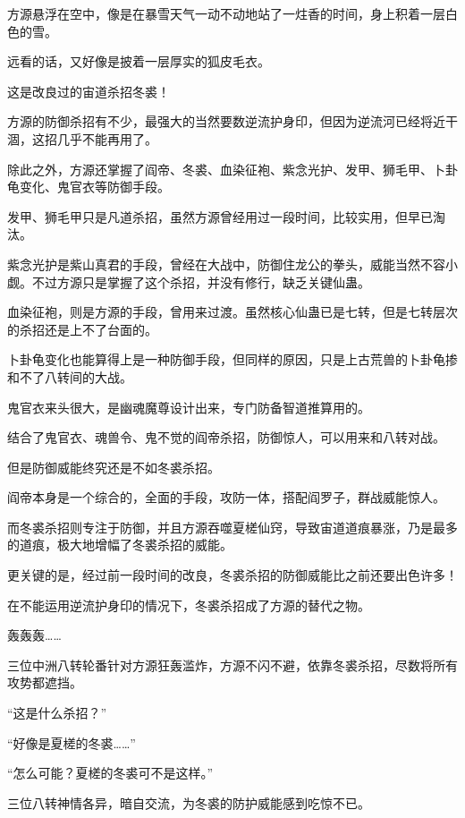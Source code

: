 
\begin{this_body}

方源悬浮在空中，像是在暴雪天气一动不动地站了一炷香的时间，身上积着一层白色的雪。

远看的话，又好像是披着一层厚实的狐皮毛衣。

这是改良过的宙道杀招冬裘！

方源的防御杀招有不少，最强大的当然要数逆流护身印，但因为逆流河已经将近干涸，这招几乎不能再用了。

除此之外，方源还掌握了阎帝、冬裘、血染征袍、紫念光护、发甲、狮毛甲、卜卦龟变化、鬼官衣等防御手段。

发甲、狮毛甲只是凡道杀招，虽然方源曾经用过一段时间，比较实用，但早已淘汰。

紫念光护是紫山真君的手段，曾经在大战中，防御住龙公的拳头，威能当然不容小觑。不过方源只是掌握了这个杀招，并没有修行，缺乏关键仙蛊。

血染征袍，则是方源的手段，曾用来过渡。虽然核心仙蛊已是七转，但是七转层次的杀招还是上不了台面的。

卜卦龟变化也能算得上是一种防御手段，但同样的原因，只是上古荒兽的卜卦龟掺和不了八转间的大战。

鬼官衣来头很大，是幽魂魔尊设计出来，专门防备智道推算用的。

结合了鬼官衣、魂兽令、鬼不觉的阎帝杀招，防御惊人，可以用来和八转对战。

但是防御威能终究还是不如冬裘杀招。

阎帝本身是一个综合的，全面的手段，攻防一体，搭配阎罗子，群战威能惊人。

而冬裘杀招则专注于防御，并且方源吞噬夏槎仙窍，导致宙道道痕暴涨，乃是最多的道痕，极大地增幅了冬裘杀招的威能。

更关键的是，经过前一段时间的改良，冬裘杀招的防御威能比之前还要出色许多！

在不能运用逆流护身印的情况下，冬裘杀招成了方源的替代之物。

轰轰轰……

三位中洲八转轮番针对方源狂轰滥炸，方源不闪不避，依靠冬裘杀招，尽数将所有攻势都遮挡。

“这是什么杀招？”

“好像是夏槎的冬裘……”

“怎么可能？夏槎的冬裘可不是这样。”

三位八转神情各异，暗自交流，为冬裘的防护威能感到吃惊不已。


\end{this_body}
